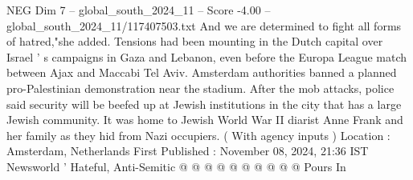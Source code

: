\begin{textsample}{NEG Dim 7 – global\_south\_2024\_11 – Score -4.00 – global\_south\_2024\_11/117407503.txt}
And we are determined to fight all forms of hatred,"she added.
Tensions had been mounting in the Dutch capital over Israel ' s campaigns in Gaza and Lebanon, even before the Europa League match between Ajax and Maccabi Tel Aviv.
Amsterdam authorities banned a planned pro-Palestinian demonstration near the stadium.
After the mob attacks, police said security will be beefed up at Jewish institutions in the city that has a large Jewish community.
It was home to Jewish World War II diarist Anne Frank and her family as they hid from Nazi occupiers. ( With agency inputs ) Location : Amsterdam, Netherlands First Published : November 08, 2024, 21:36 IST Newsworld ' Hateful, Anti-Semitic @ @ @ @ @ @ @ @ @ @ Pours In

\end{textsample}
